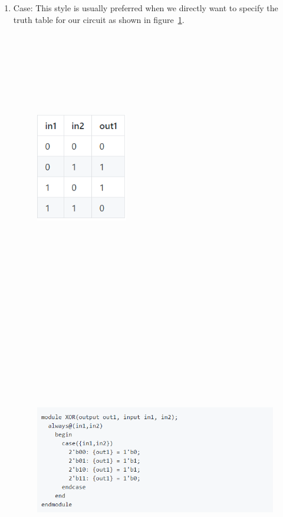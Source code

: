 \documentclass[11pt]{article}
\begin{document}
\begin{enumerate}
\item Case: 
This style is usually preferred when we directly want to specify the truth table for our circuit as shown in figure~\ref{Case statements exmaple}. \bigskip
\begin{figure}[ht!]
\centering
\includegraphics[width=4cm,height=12cm,keepaspectratio]{case_1.png}
\includegraphics[width=11cm,height=14cm,keepaspectratio]{case_2.png}
\label{Case statements exmaple}
\end{figure}


\end{enumerate}
\end{document}
